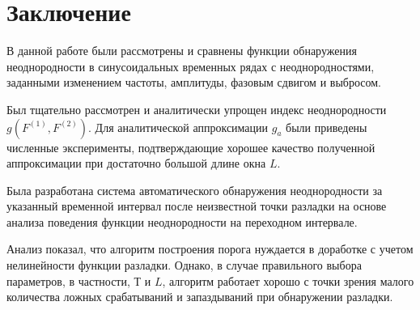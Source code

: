 \documentclass[specialist, substylefile = spbu.rtx,
			   subf, href, 12pt]{disser}
\begin{document}
\newpage
\chapter*{Заключение}

В данной работе были рассмотрены и сравнены функции обнаружения неоднородности в синусоидальных временных рядах с неоднородностями, заданными изменением частоты, амплитуды, фазовым сдвигом и выбросом. 

Был тщательно рассмотрен и аналитически упрощен индекс неоднородности \newline $ g(F^{(1)}, F^{(2)}) $. Для аналитической аппроксимации $ g_a $ были приведены численные эксперименты, подтверждающие хорошее качество полученной аппроксимации при достаточно большой длине окна $L$.

Была разработана система автоматического обнаружения неоднородности за указанный временной интервал после неизвестной точки разладки на основе анализа поведения функции неоднородности на переходном интервале.

Анализ показал, что алгоритм построения порога нуждается в доработке с учетом нелинейности функции разладки. Однако, в случае правильного выбора параметров, в частности, $ Т $ и $ L $, алгоритм работает хорошо с точки зрения малого количества ложных срабатываний и запаздываний при обнаружении разладки.




\end{document}
